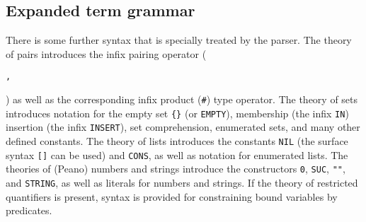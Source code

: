 \subsection{Expanded term grammar}

There is some further syntax that is specially treated by the
 parser. The theory of pairs introduces the infix pairing operator
 (\begin{Large}\verb+,+\end{Large}) as well as the corresponding infix
 product (\verb+#+) type operator. The theory of sets introduces
 notation for the empty set \verb+{}+ (or \verb+EMPTY+), membership (the
 infix \verb+IN+) insertion (the infix \verb+INSERT+), set
 comprehension, enumerated sets, and many other defined constants. The
 theory of lists introduces the constants \verb+NIL+ (the surface syntax
 \verb+[]+ can be used) and \verb+CONS+, as well as notation for
 enumerated lists. The theories of (Peano) numbers and strings introduce
 the constructors \verb+0+, \verb+SUC+, \verb+""+, and \verb+STRING+, as
 well as literals for numbers and strings. If the theory of restricted
 quantifiers is present, syntax is provided for constraining bound
 variables by predicates.

